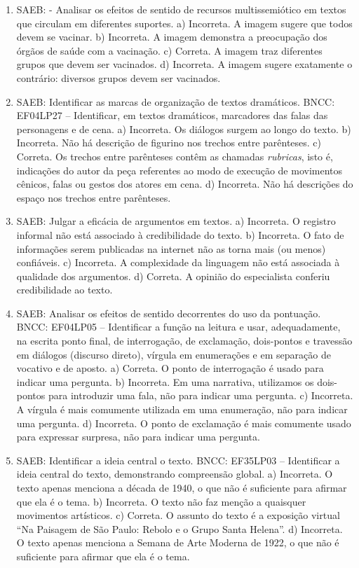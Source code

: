 \begin{enumerate}
\item
SAEB: - Analisar os efeitos de sentido de recursos multissemiótico em textos que circulam em diferentes suportes. a) Incorreta. A imagem sugere que todos devem se vacinar. b) Incorreta.  A imagem demonstra a preocupação dos órgãos de saúde com a vacinação. c) Correta. A imagem traz diferentes grupos que devem ser vacinados. d) Incorreta. A imagem sugere exatamente o contrário: diversos grupos devem ser vacinados.

\item
SAEB: Identificar as marcas de organização de textos dramáticos. BNCC: EF04LP27 -- Identificar, em textos dramáticos, marcadores das falas das personagens e de cena. a) Incorreta. Os diálogos surgem ao longo do texto. b) Incorreta. Não há descrição de figurino nos trechos entre parênteses. c) Correta. Os trechos entre parênteses contêm as chamadas \textit{rubricas}, isto é, indicações do autor da peça referentes ao modo de execução de movimentos cênicos, falas ou gestos dos atores em cena. d) Incorreta. Não há descrições do espaço nos trechos entre parênteses.

\item
SAEB: Julgar a eficácia de argumentos em textos. a) Incorreta. O registro informal não está associado à credibilidade do texto. b) Incorreta. O fato de informações serem publicadas na internet não as torna mais (ou menos) confiáveis. c) Incorreta. A complexidade da linguagem não está associada à qualidade dos argumentos. d) Correta. A opinião do especialista conferiu credibilidade ao texto.

\item
SAEB: Analisar os efeitos de sentido decorrentes do uso da pontuação. BNCC: EF04LP05 -- Identificar a função na leitura e usar, adequadamente, na escrita ponto final, de interrogação, de exclamação, dois-pontos e travessão em diálogos (discurso direto), vírgula em enumerações e em separação de vocativo e de aposto. a) Correta. O ponto de interrogação é usado para indicar uma pergunta. b) Incorreta. Em uma narrativa, utilizamos os dois-pontos para introduzir uma fala, não para indicar uma pergunta. c) Incorreta. A vírgula é mais comumente utilizada em uma enumeração, não para indicar uma pergunta. d) Incorreta. O ponto de exclamação é mais comumente usado para expressar surpresa, não para indicar uma pergunta.

\item
SAEB: Identificar a ideia central o texto. BNCC: EF35LP03 -- Identificar a ideia central do texto, demonstrando compreensão global. a) Incorreta. O texto apenas menciona a década de 1940, o que não é suficiente para afirmar que ela é o tema. b) Incorreta. O texto não faz menção a quaisquer movimentos artísticos. c) Correta. O assunto do texto é a exposição virtual ``Na Paisagem de São Paulo: Rebolo e o Grupo Santa Helena''. d) Incorreta. O texto apenas menciona a Semana de Arte Moderna de 1922, o que não é suficiente para afirmar que ela é o tema.


\end{enumerate}
